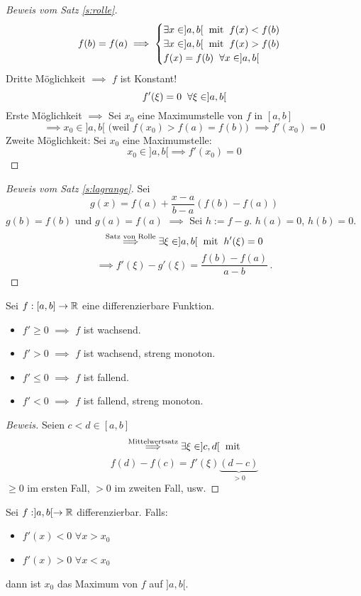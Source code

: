 \begin{proof}[Beweis vom Satz \ref{s:rolle}]
  \[f(b)=f(a)\implies \begin{cases}
    \exists x\in ]a,b[\hspace{2mm}\text{mit}\hspace{2mm} f(x)<f(b)\\
    \exists x\in ]a,b[\hspace{2mm}\text{mit}\hspace{2mm} f(x)>f(b)\\
    f(x)=f(b)\hspace{2mm}\forall x\in ]a,b[
  \end{cases}\]
  Dritte Möglichkeit $\implies$ $f$ ist Konstant!
  \[f'(\xi)=0\hspace{2mm}\forall \xi\in ]a,b[ \]
  Erste Möglichkeit $\implies$ Sei $x_0$ eine Maximumstelle von $f$ in $[a,b]$
  \[\implies x_0\in ]a,b[ \mbox{ (weil $f (x_0) > f(a) = f(b)$) } \implies f'(x_0)=0\]
  Zweite Möglichkeit: Sei $x_0$ eine Maximumstelle:
  \[x_0\in ]a,b[\implies f'(x_0)=0\]
\end{proof}
\begin{proof}[Beweis vom Satz \ref{s:lagrange}]
  Sei
  \[g(x)=f(a)+\frac{x-a}{b-a}(f(b)-f(a))\]
  $g(b)=f(b)$ und $g(a)=f(a)$ $\implies$ Sei $h:=f-g$. $h(a)=0$, $h(b)=0$. 
  \[\stackrel{\text{Satz von Rolle}}{\implies}\exists \xi\in ]a,b[\hspace{2mm}\text{mit}\hspace{2mm} h'(\xi)=0\]
  \[\implies f'(\xi)-g'(\xi)=\frac{f(b)-f(a)}{a-b}\, .\]
\end{proof}
\begin{Kor}\label{k:monot}
  Sei $f:[a,b]\to\mathbb{R}$ eine differenzierbare Funktion.
  \begin{itemize}
    \item $f'\geq 0$ $\implies$ $f$ ist wachsend.
    \item $f'> 0$ $\implies$ $f$ ist wachsend, streng monoton.
    \item $f'\leq 0$ $\implies$ $f$ ist fallend.
    \item $f'< 0$ $\implies$ $f$ ist fallend, streng monoton.
  \end{itemize}
\end{Kor}
\begin{proof}[Beweis]
  Seien $c<d\in [a,b]$
  \[\stackrel{\text{Mittelwertsatz}}{\implies}\exists \xi\in ]c,d[\hspace{2mm}\text{mit}\]
  \[f(d)-f(c)= f'(\xi)\underbrace{(d-c)}_{>0}\]
  $\geq 0$ im ersten Fall, $>0$ im zweiten Fall, usw.
\end{proof}
\begin{Kor}
  Sei $f:]a,b[\to\mathbb{R}$ differenzierbar. Falls:
  \begin{itemize}
    \item $f'(x)<0$ $\forall x>x_0$
    \item $f'(x)>0$ $\forall x<x_0$
  \end{itemize}
  dann ist $x_0$ das Maximum von $f$ auf $]a,b[$.
\end{Kor}
